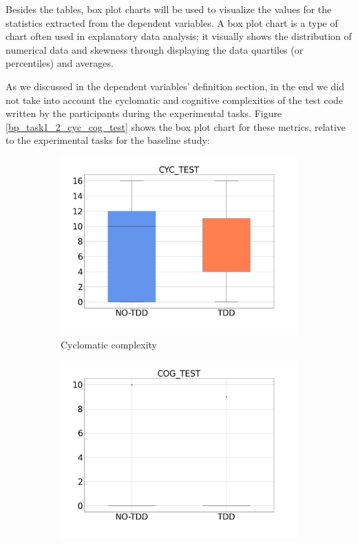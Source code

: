 Besides the tables, box plot charts will be used to visualize the values for the statistics extracted from the dependent variables. A box plot chart is a type of chart often used in explanatory data analysis; it visually shows the distribution of numerical data and skewness through displaying the data quartiles (or percentiles) and averages.

As we discussed in the dependent variables' definition section, in the end we did not take into account the cyclomatic and cognitive complexities of the test code written by the participants during the experimental tasks. 
Figure \ref{bp_task1_2_cyc_cog_test} shows the box plot chart for these metrics, relative to the experimental tasks for the baseline study:

\begin{figure}[htbp]
    \begin{subfigure}{0.5\textwidth}
        \includegraphics[width=\linewidth]{figures/box_plots/CYC_TEST.png}
        \caption{Cyclomatic complexity }
        \label{bp_task1_2_cyc_test}
    \end{subfigure}\hfil
    \begin{subfigure}{0.5\textwidth}
        \includegraphics[width=\linewidth]{figures/box_plots/COG_TEST.png}

\end{subfigure}
\end{figure}

